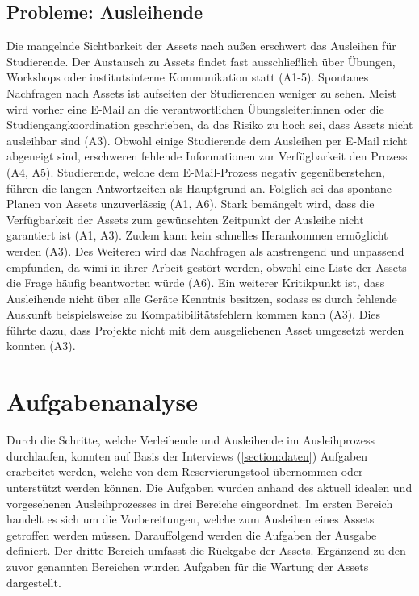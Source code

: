\subsection{Probleme: Ausleihende}
\label{section:probleme-Ausleihende}
Die mangelnde Sichtbarkeit der Assets nach außen erschwert das Ausleihen für Studierende. Der
Austausch zu Assets findet fast ausschließlich über Übungen, Workshops oder institutsinterne
Kommunikation statt (A1-5). Spontanes Nachfragen nach Assets ist aufseiten der Studierenden weniger
zu sehen. Meist wird vorher eine E-Mail an die verantwortlichen Übungsleiter:innen oder die
Studiengangkoordination geschrieben, da das Risiko zu hoch sei, dass Assets nicht ausleihbar sind
(A3). Obwohl einige Studierende dem Ausleihen per E-Mail nicht abgeneigt sind, erschweren fehlende
Informationen zur Verfügbarkeit den Prozess (A4, A5). Studierende, welche dem E-Mail-Prozess negativ
gegenüberstehen, führen die langen Antwortzeiten als Hauptgrund an. Folglich sei das spontane Planen
von Assets unzuverlässig (A1, A6). Stark bemängelt wird, dass die Verfügbarkeit der Assets zum
gewünschten Zeitpunkt der Ausleihe nicht garantiert ist (A1, A3). Zudem kann kein schnelles
Herankommen ermöglicht werden (A3). Des Weiteren wird das Nachfragen als anstrengend und unpassend
empfunden, da \ac{wimi} in ihrer Arbeit gestört werden, obwohl eine Liste der Assets die Frage
häufig beantworten würde (A6). Ein weiterer Kritikpunkt ist, dass Ausleihende nicht über alle Geräte
Kenntnis besitzen, sodass es durch fehlende Auskunft beispielsweise zu Kompatibilitätsfehlern kommen
kann (A3). Dies führte dazu, dass Projekte nicht mit dem ausgeliehenen Asset umgesetzt werden
konnten (A3).

\section{Aufgabenanalyse}
\label{section:aufgaben}
Durch die Schritte, welche Verleihende und Ausleihende im Ausleihprozess durchlaufen, konnten auf
Basis der Interviews (\ref{section:daten}) Aufgaben erarbeitet werden, welche von dem
Reservierungstool übernommen oder unterstützt werden können. Die Aufgaben wurden anhand des aktuell
idealen und vorgesehenen Ausleihprozesses in drei Bereiche eingeordnet. Im ersten Bereich handelt es
sich um die Vorbereitungen, welche zum Ausleihen eines Assets getroffen werden müssen. Darauffolgend
werden die Aufgaben der Ausgabe definiert. Der dritte Bereich umfasst die Rückgabe der Assets.
Ergänzend zu den zuvor genannten Bereichen wurden Aufgaben für die Wartung der Assets dargestellt.

